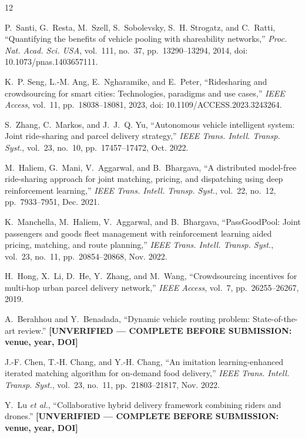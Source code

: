 \documentclass[conference]{IEEEtran}
\begin{document}
\balance
\begin{thebibliography}{12}

P.~Santi, G.~Resta, M.~Szell, S.~Sobolevsky, S.~H. Strogatz, and C.~Ratti,
``Quantifying the benefits of vehicle pooling with shareability networks,''
\emph{Proc. Nat. Acad. Sci. USA}, vol.~111, no.~37, pp.~13290--13294, 2014,
doi: 10.1073/pnas.1403657111.

K.~P. Seng, L.-M. Ang, E.~Ngharamike, and E.~Peter, ``Ridesharing and
crowdsourcing for smart cities: Technologies, paradigms and use cases,''
\emph{IEEE Access}, vol.~11, pp.~18038--18081, 2023,
doi: 10.1109/ACCESS.2023.3243264.

S.~Zhang, C.~Markos, and J.~J.~Q. Yu, ``Autonomous vehicle intelligent system:
Joint ride-sharing and parcel delivery strategy,'' \emph{IEEE Trans. Intell.
Transp. Syst.}, vol.~23, no.~10, pp.~17457--17472, Oct. 2022.

M.~Haliem, G.~Mani, V.~Aggarwal, and B.~Bhargava, ``A distributed model-free
ride-sharing approach for joint matching, pricing, and dispatching using deep
reinforcement learning,'' \emph{IEEE Trans. Intell. Transp. Syst.}, vol.~22,
no.~12, pp.~7933--7951, Dec. 2021.

K.~Manchella, M.~Haliem, V.~Aggarwal, and B.~Bhargava, ``PassGoodPool: Joint
passengers and goods fleet management with reinforcement learning aided
pricing, matching, and route planning,'' \emph{IEEE Trans. Intell. Transp.
Syst.}, vol.~23, no.~11, pp.~20854--20868, Nov. 2022.

H.~Hong, X.~Li, D.~He, Y.~Zhang, and M.~Wang, ``Crowdsourcing incentives for
multi-hop urban parcel delivery network,'' \emph{IEEE Access}, vol.~7,
pp.~26255--26267, 2019.

A.~Berahhou and Y.~Benadada, ``Dynamic vehicle routing problem:
State-of-the-art review.''
\textbf{[UNVERIFIED --- COMPLETE BEFORE SUBMISSION: venue, year, DOI]}

J.-F. Chen, T.-H. Chang, and Y.-H. Chang, ``An imitation learning-enhanced
iterated matching algorithm for on-demand food delivery,'' \emph{IEEE Trans.
Intell. Transp. Syst.}, vol.~23, no.~11, pp.~21803--21817, Nov. 2022.

Y.~Lu \emph{et al.}, ``Collaborative hybrid delivery framework combining
riders and drones.''
\textbf{[UNVERIFIED --- COMPLETE BEFORE SUBMISSION: venue, year, DOI]}


\end{thebibliography}
\end{document}
